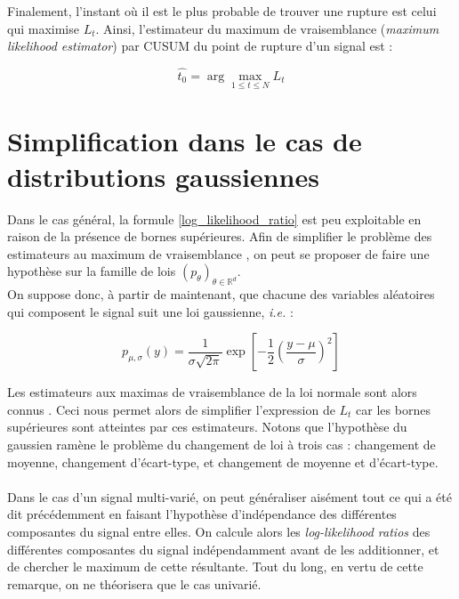 \documentclass[french,11pt,notitlepage]{report}
\begin{document}
	Finalement, l'instant où il est le plus probable de trouver une rupture est celui qui maximise $L_t$.
	Ainsi, l'estimateur du maximum de vraisemblance (\emph{maximum likelihood estimator}) par CUSUM du point de rupture d'un signal est :
	
	\begin{equation}
		\hat{t_0}=\arg\max_{1\le t\le N}L_t
	\end{equation}
	
	
	\section{Simplification dans le cas de distributions gaussiennes}

	
	Dans le cas général, la formule \ref{log_likelihood_ratio} est peu exploitable en raison de la présence de bornes supérieures.
	Afin de simplifier le problème des estimateurs au maximum de vraisemblance
	, on peut se proposer de faire une hypothèse sur la famille de lois $(p_\theta)_{\theta \in \mathbb{R}^d}$.
	\\
	
	On suppose donc, à partir de maintenant, que chacune des variables aléatoires qui composent le signal suit une loi gaussienne, \emph{i.e.} :
	
	\begin{equation*}
		p_{\mu, \sigma}(y) = \frac1{\sigma\sqrt{2 \pi}} \exp \left[ -\frac12 \left( \frac{y - \mu}{\sigma} \right)^2 \right]
	\end{equation*}
	
	Les estimateurs aux maximas de vraisemblance de la loi normale sont alors connus \cite{MLE}.
	Ceci nous permet alors de simplifier l'expression de $L_t$
	car les bornes supérieures sont atteintes par ces estimateurs.
	Notons que l'hypothèse du gaussien ramène le problème du changement de loi à trois cas : changement de moyenne, changement d'écart-type, et changement de moyenne et d'écart-type.
	\\ \\
	Dans le cas d'un signal multi-varié, on peut généraliser aisément tout ce qui a été dit précédemment en faisant l'hypothèse d'indépendance des différentes composantes du signal entre elles. On calcule alors les \textit{log-likelihood ratios} des différentes composantes du signal indépendamment avant de les additionner, et de chercher le maximum de cette résultante. Tout du long, en vertu de cette remarque, on ne théorisera que le cas univarié.
	\\ \\
	
\end{document}
